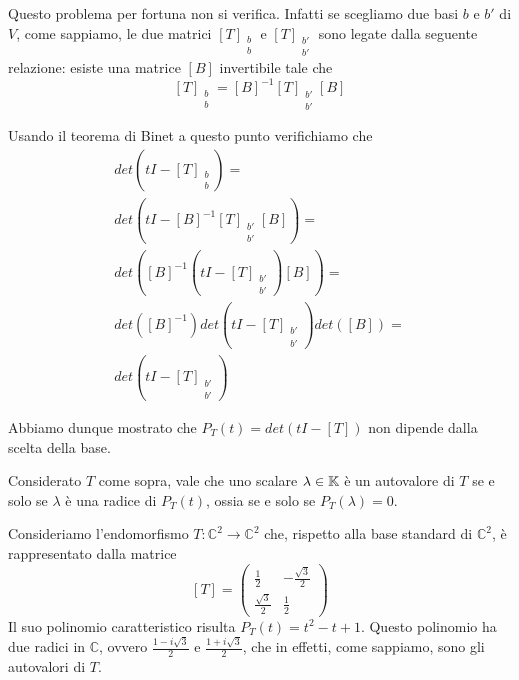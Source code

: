 Questo problema per fortuna non si verifica. Infatti se scegliamo due basi $b$ e
$b'$ di $V$, come sappiamo, le due matrici $[T]_{\substack{b \\ b}}$ e
$[T]_{\substack{b' \\ b'}}$ sono legate dalla seguente relazione: esiste una
matrice $[B]$ invertibile tale che
\[
	[T]_{\substack{b \\ b}} =
		[B]^{-1} [T]_{\substack{b' \\ b'}} [B]
\]

Usando il teorema di Binet a questo punto verifichiamo che
\begin{gather*}
	det \left(tI - [T]_{\substack{b \\ b}}\right) = \\
	det \left(tI - [B]^{-1} [T]_{\substack{b' \\ b'}} [B]\right) = \\
	det \left([B]^{-1} \left(tI - [T]_{\substack{b' \\ b'}}\right) [B] \right) = \\
	det \left([B]^{-1}\right) det \left(tI - [T]_{\substack{b' \\ b'}}\right)
	det \left([B]\right) = \\
	det \left(tI - [T]_{\substack{b' \\ b'}}\right)
\end{gather*}

Abbiamo dunque mostrato che $P_T(t) = det(tI - [T])$ non dipende dalla scelta della
base.

\begin{theorem}
	Considerato $T$ come sopra, vale che uno scalare $\lambda \in \mathbb{K}$ è un
	autovalore di $T$ se e solo se $\lambda$ è una radice di $P_T(t)$, ossia se e
	solo se $P_T(\lambda) = 0$.
\end{theorem}

\begin{example}
	Consideriamo l'endomorfismo $T : \mathbb{C}^2 \to \mathbb{C}^2$ che, rispetto
	alla base standard di $\mathbb{C}^2$, è rappresentato dalla matrice
	\[
		[T] = \begin{pmatrix}
			\frac{1}{2}        & -\frac{\sqrt{3}}{2} \\
			\frac{\sqrt{3}}{2} & \frac{1}{2}
		\end{pmatrix}
	\]
	Il suo polinomio caratteristico risulta $P_T(t) = t^2 - t + 1$. Questo polinomio
	ha due radici in $\mathbb{C}$, ovvero $\frac{1 - i\sqrt{3}}{2}$ e
	$\frac{1 + i\sqrt{3}}{2}$, che in effetti, come sappiamo, sono gli autovalori
	di $T$.
\end{example}


